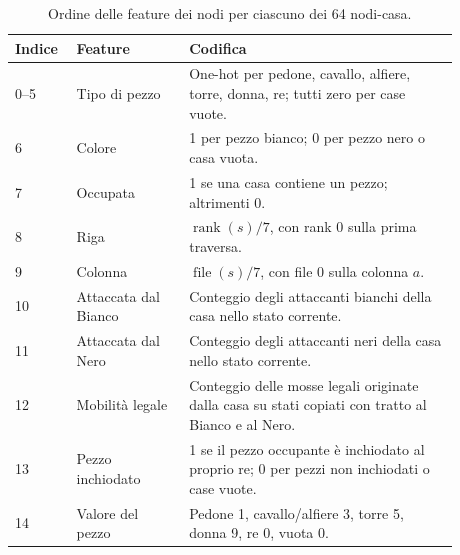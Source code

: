 \begin{table}[H]
\centering
\scriptsize
\caption{Ordine delle feature dei nodi per ciascuno dei 64 nodi-casa.}
\label{tab:node-features}
\begin{tabular}{p{0.10\linewidth}p{0.23\linewidth}p{0.55\linewidth}}
\toprule
Indice & Feature & Codifica \\
\midrule
0--5 & Tipo di pezzo & One-hot per pedone, cavallo, alfiere, torre, donna, re; tutti zero per case vuote. \\
6 & Colore & 1 per pezzo bianco; 0 per pezzo nero o casa vuota. \\
7 & Occupata & 1 se una casa contiene un pezzo; altrimenti 0. \\
8 & Riga & \(\operatorname{rank}(s)/7\), con rank 0 sulla prima traversa. \\
9 & Colonna & \(\operatorname{file}(s)/7\), con file 0 sulla colonna \(a\). \\
10 & Attaccata dal Bianco & Conteggio degli attaccanti bianchi della casa nello stato corrente. \\
11 & Attaccata dal Nero & Conteggio degli attaccanti neri della casa nello stato corrente. \\
12 & Mobilità legale & Conteggio delle mosse legali originate dalla casa su stati copiati con tratto al Bianco e al Nero. \\
13 & Pezzo inchiodato & 1 se il pezzo occupante è inchiodato al proprio re; 0 per pezzi non inchiodati o case vuote. \\
14 & Valore del pezzo & Pedone 1, cavallo/alfiere 3, torre 5, donna 9, re 0, vuota 0. \\
\bottomrule
\end{tabular}
\end{table}
